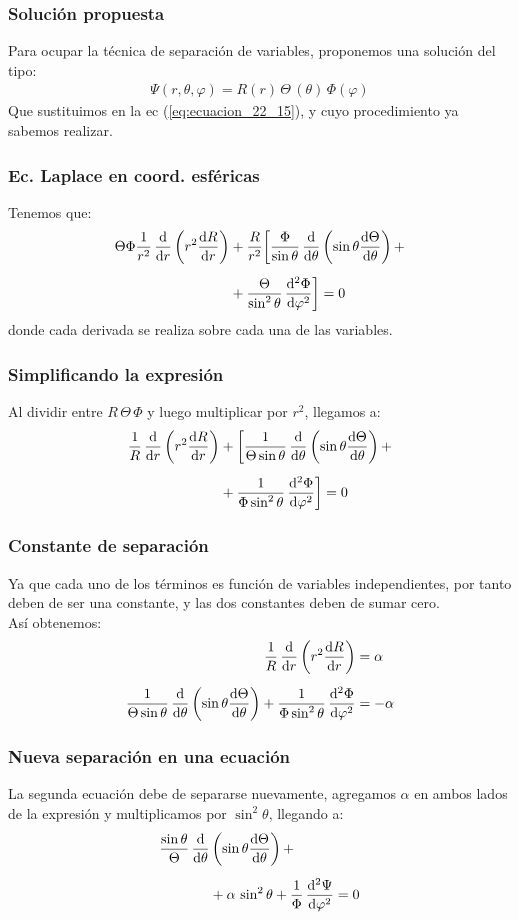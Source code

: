 \documentclass[12pt]{beamer}
\begin{document}
\begin{frame}
\frametitle{Solución propuesta}
Para ocupar la técnica de separación de variables, proponemos una solución del tipo:
\pause
\begin{align*}
\Psi(r, \theta, \varphi) = R(r) \, \Theta \, (\theta) \, \Phi(\varphi)
\end{align*}
Que sustituimos en la ec (\ref{eq:ecuacion_22_15}), y cuyo procedimiento ya sabemos realizar.
\end{frame}
\begin{frame}
\frametitle{Ec. Laplace en coord. esféricas}
Tenemos que:
\pause
\begin{align*}
\Theta \Phi \dfrac{1}{r^{2}} \, \dv{r} \left( r^{2} \dv{R}{r} \right) &+ \dfrac{R}{r^{2}} \bigg[ \dfrac{\Phi}{\sin \theta} \, \dv{\theta} \left( \sin \theta \dv{\Theta}{\theta} \right) + \\[0.5em]
&+ \dfrac{\Theta}{\sin^{2} \theta} \, \dv[2]{\Phi}{\varphi} \bigg] = 0
\end{align*}
donde cada derivada se realiza sobre cada una de las variables.
\end{frame}
\begin{frame}
\frametitle{Simplificando la expresión}
Al dividir entre $R \, \Theta \, \Phi$ y luego multiplicar por $r^{2}$, llegamos a:
\pause
\begin{align*}
\dfrac{1}{R} \, \dv{r} \left( r^{2} \dv{R}{r} \right) &+ \bigg[ \dfrac{1}{\Theta \sin \theta} \, \dv{\theta} \left( \sin \theta \dv{\Theta}{\theta} \right) + \\[0.5em]
&+ \dfrac{1}{\Phi \sin^{2} \theta} \, \dv[2]{\Phi}{\varphi} \bigg] = 0
\end{align*}
\end{frame}
\begin{frame}
\frametitle{Constante de separación}
Ya que cada uno de los términos es función de variables independientes, por tanto deben de ser una constante, y las dos constantes deben de sumar cero.
\\
\bigskip
\pause
Así obtenemos:
\pause
\begin{align*}
\dfrac{1}{R} \, \dv{r} \left( r^{2} \dv{R}{r} \right) &= \alpha \\[0.5em]
\dfrac{1}{\Theta \sin \theta} \, \dv{\theta} \left( \sin \theta \dv{\Theta}{\theta} \right) + \dfrac{1}{\Phi \sin^{2} \theta} \, \dv[2]{\Phi}{\varphi} &= - \alpha
\end{align*}
\end{frame}
\begin{frame}
\frametitle{Nueva separación en una ecuación}
La segunda ecuación debe de separarse nuevamente, agregamos $\alpha$ en ambos lados de la expresión y multiplicamos por $\sin^{2} \theta$, llegando a:
\pause
\begin{align*}
\dfrac{\sin \theta}{\Theta} \, \dv{\theta} &\left( \sin \theta \dv{\Theta}{\theta} \right) + \\[0.5em]
&+\alpha \, \sin^{2} \theta +  \dfrac{1}{\Phi} \, \dv[2]{\Psi}{\varphi} = 0
\end{align*}
\end{frame}
\end{document}
